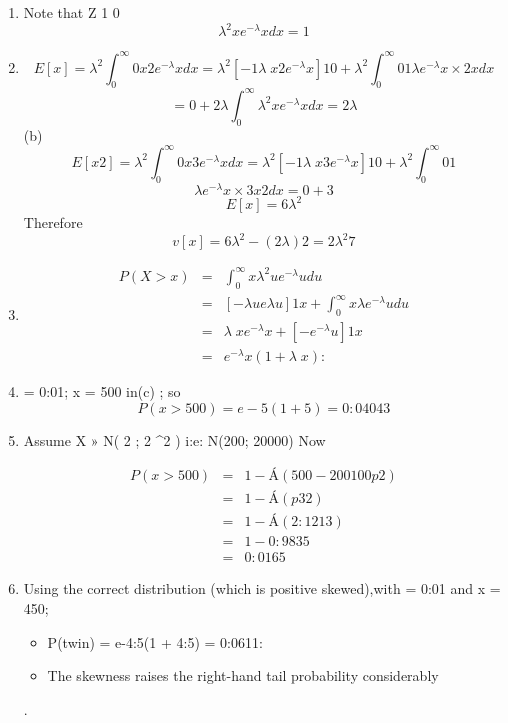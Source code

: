 \documentclass[a4paper,12pt]{article}
\begin{document}
\begin{enumerate}
\item  Note that Z 1
0
\[\lambda^2 xe^{-\lambda}xdx = 1\]
\item 
\[E[x] = \lambda^2  \int^{\infty}_{0}
0 x2e^{-\lambda}xdx = \lambda^2 [-1
\lambda \;x2e^{-\lambda}x]1
0 + \lambda^2  \int^{\infty}_{0}
0
1
\lambda e^{-\lambda}x \times 2xdx\]
\[= 0 + 2
\lambda
\int^{\infty}_{0}
 \lambda^2 xe^{-\lambda}xdx = 2
\lambda\]
(b)
\[E[x2] = \lambda^2  \int^{\infty}_{0}
0 x3e^{-\lambda}xdx = \lambda^2 [-1
\lambda \;x3e^{-\lambda}x]1
0 + \lambda^2  \int^{\infty}_{0}
0
1\]
\[\lambda e^{-\lambda}x \times 3x2dx
= 0 + 3\]
\[E[x] = 6
\lambda^2 \]
Therefore
\[v[x] =
6
\lambda^2 
- (
2
\lambda
)2 =
2
\lambda^2 
7\]
\item 
\begin{eqnarray*}
P(X > x) &=&
\int^{\infty}_{0}
x \lambda^2 ue^{-\lambda}udu \\ &=& [-\lambda u e\lambda u]1x
+
\int^{\infty}_{0}
x \lambda e^{-\lambda}udu
\\ &=& \lambda \;xe^{-\lambda}x + [-e^{-\lambda}u]1x
\\ &=& e^{-\lambda}x(1 + \lambda \;x):
\end{eqnarray*}
\item  \lambda = 0:01; x = 500 in(c) ; so \[P(x > 500) = e-5(1 + 5) = 0:04043\]
\item Assume X » N( 2
\lambda; 2
\lambda^2  ) i:e: N(200; 20000)
Now

\begin{eqnarray*}
P(x > 500) &=& 1 - Á( 500-200
100
p2 ) \\
&=& 1 - Á(p3 2 )\\
&=& 1 - Á(2:1213) \\
&=& 1 - 0:9835 \\ &=& 0:0165
\end{eqnarray*}
\item Using the correct distribution (which is positive skewed),with \lambda = 0:01 and x = 450;

\begin{itemize}
    \item P(twin) = e-4:5(1 + 4:5) = 0:0611: 
    \item The skewness raises the right-hand tail probability
considerably
\end{itemize}
.

\end{enumerate}
\end{document}
